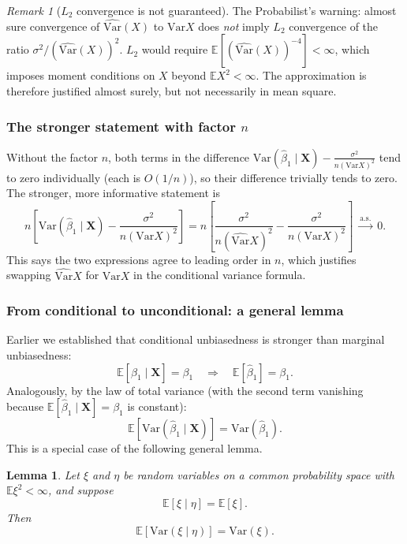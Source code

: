 \documentclass[a4paper,oneside,12pt]{extarticle}
\theoremstyle{plain}
\newtheorem{lemma}[proposition]{Lemma}
\theoremstyle{definition}
\theoremstyle{remark}
\newtheorem{remark}[proposition]{Remark}
\newcommand*{\E}{\mathbb{E}}
\newcommand*{\Var}{\mathrm{Var}}
\begin{document}
\begin{remark}[$L_2$ convergence is not guaranteed]
The Probabilist's warning: almost sure convergence of $\widehat{\Var}(X)$ to
$\Var X$ does \emph{not} imply $L_2$ convergence of the ratio
$\sigma^2/(\widehat{\Var}(X))^2$.  $L_2$ would require
$\E[(\widehat{\Var}(X))^{-4}]<\infty$, which imposes moment conditions
on $X$ beyond $\E X^2 < \infty$.  The approximation is therefore
justified almost surely, but not necessarily in mean square.
\end{remark}

\subsubsection{The stronger statement with factor \texorpdfstring{$n$}{n}}

Without the factor $n$, both terms in the difference
$\Var(\hat\beta_1\mid\mathbf{X}) - \tfrac{\sigma^2}{n(\Var X)^2}$
tend to zero individually (each is $O(1/n)$), so their difference
trivially tends to zero.  The stronger, more informative statement is
\[
  n\!\left[\Var(\hat\beta_1\mid\mathbf{X})
           - \frac{\sigma^2}{n(\Var X)^2}\right]
  = n\!\left[\frac{\sigma^2}{n(\widehat{\Var}X)^2}
             - \frac{\sigma^2}{n(\Var X)^2}\right]
  \;\xrightarrow{\mathrm{a.s.}}\; 0.
\]
This says the two expressions agree to leading order in $n$, which
justifies swapping $\widehat{\Var}X$ for $\Var X$ in the conditional
variance formula.

\subsubsection{From conditional to unconditional: a general lemma}

Earlier we established that conditional unbiasedness is stronger than
marginal unbiasedness:
\[
  \E[\hat\beta_1 \mid \mathbf{X}] = \beta_1
  \quad\Longrightarrow\quad
  \E[\hat\beta_1] = \beta_1.
\]
Analogously, by the law of total variance (with the second term
vanishing because $\E[\hat\beta_1\mid\mathbf{X}]=\beta_1$ is constant):
\[
  \E\!\left[\Var(\hat\beta_1\mid\mathbf{X})\right] = \Var(\hat\beta_1).
\]
This is a special case of the following general lemma.

\begin{lemma}
Let $\xi$ and $\eta$ be random variables on a common probability
space with $\E\xi^2 < \infty$, and suppose
\[
  \E[\xi \mid \eta] = \E[\xi].
\]
Then
\[
  \E\!\left[\Var(\xi\mid\eta)\right] = \Var(\xi).
\]
\end{lemma}
\end{document}
